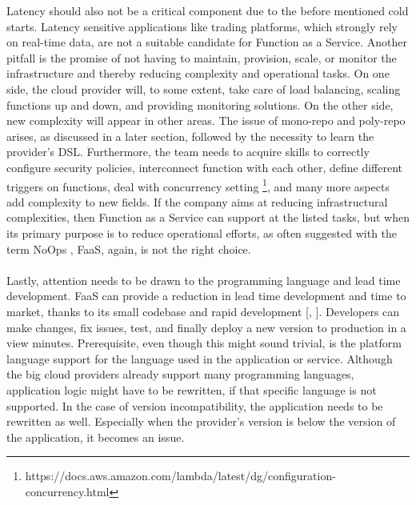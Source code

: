 \documentclass[11pt]{article}
\begin{document}
Latency should also not be a critical component due to the before mentioned cold starts. Latency sensitive applications like trading platforms, which strongly rely on real-time data, are not a suitable candidate for Function as a Service. Another pitfall is the promise of not having to maintain, provision, scale, or monitor the infrastructure and thereby reducing complexity and operational tasks. On one side, the cloud provider will, to some extent, take care of load balancing, scaling functions up and down, and providing monitoring solutions. On the other side, new complexity will appear in other areas. The issue of mono-repo and poly-repo arises, as discussed in a later section, followed by the necessity to learn the provider's DSL. Furthermore, the team needs to acquire skills to correctly configure security policies, interconnect function with each other, define different triggers on functions, deal with concurrency setting \footnote{https://docs.aws.amazon.com/lambda/latest/dg/configuration-concurrency.html}, and many more aspects add complexity to new fields. If the company aims at reducing infrastructural complexities, then Function as a Service can support at the listed tasks, but when its primary purpose is to reduce operational efforts, as often suggested with the term \glqq NoOps\grqq{} \cite{eivy2017wary}, FaaS, again, is not the right choice. \\\\
Lastly, attention needs to be drawn to the programming language and lead time development. FaaS can provide a reduction in lead time development and time to market, thanks to its small codebase and rapid development [\cite{sewak2018winning}, \cite{leitner2019mixed}]. Developers can make changes, fix issues, test, and finally deploy a new version to production in a view minutes. Prerequisite, even though this might sound trivial, is the platform language support for the language used in the application or service. Although the big cloud providers already support many programming languages, application logic might have to be rewritten, if that specific language is not supported. In the case of version incompatibility, the application needs to be rewritten as well. Especially when the provider's version is below the version of the application, it becomes an issue.
\end{document}
